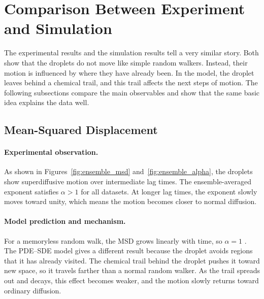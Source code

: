 
\section{Comparison Between Experiment and Simulation}
\label{sec:comparison}

The experimental results and the simulation results tell a very similar story. Both show that the droplets do not move like simple random walkers. Instead, their motion is influenced by where they have already been. In the model, the droplet leaves behind a chemical trail, and this trail affects the next steps of motion. The following subsections compare the main observables and show that the same basic idea explains the data well.

\subsection{Mean-Squared Displacement}
\label{subsec:comp_msd}

\paragraph{Experimental observation.}
As shown in Figures~\ref{fig:ensemble_msd} and~\ref{fig:ensemble_alpha}, the droplets show superdiffusive motion over intermediate lag times. The ensemble-averaged exponent satisfies $\alpha > 1$ for all datasets. At longer lag times, the exponent slowly moves toward unity, which means the motion becomes closer to normal diffusion.

\paragraph{Model prediction and mechanism.}
For a memoryless random walk, the MSD grows linearly with time, so $\alpha = 1$ \cite{klafter2011,resnick1992}. The PDE--SDE model gives a different result because the droplet avoids regions that it has already visited\cite{droplet2025}. The chemical trail behind the droplet pushes it toward new space, so it travels farther than a normal random walker. As the trail spreads out and decays, this effect becomes weaker, and the motion slowly returns toward ordinary diffusion.

